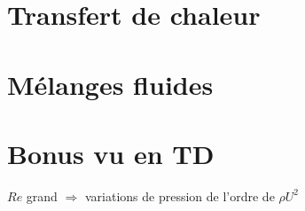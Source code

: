 \documentclass[10pt,a4paper,twocolumn,fleqn]{article}
\begin{document}
\section{Transfert de chaleur}


\section{Mélanges fluides} %


\section{Bonus vu en TD}
$Re$ grand $\Rightarrow$ variations de pression de l'ordre de $\rho U^2$

\nocite{*}


\end{document}
